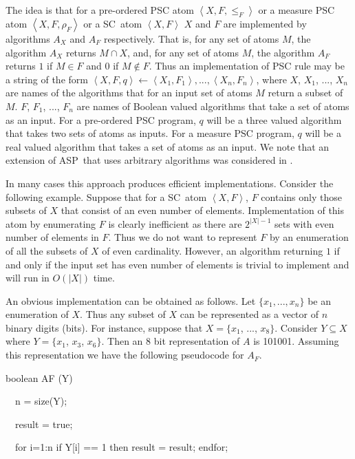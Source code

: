 \documentclass[letterpaper]{article}\usepackage{aaai}
\begin{document}
The idea is that for a pre-ordered PSC atom $\left\langle X,F,\leq
_{F}\right\rangle $ or a measure PSC atom $\left\langle X,F,\rho
_{F}\right\rangle $ or a SC\ atom $\left\langle X,F\right\rangle $ $X$ and $F$
are implemented by algorithms $A_{X}$ and $A_{F}$ respectively. That is, for
any set of atoms $M$, the algorithm $A_{X}$ returns $M\cap X$, and, for any
set of atoms $M$, the algorithm $A_{F}$ returns $1$ if $M\in F$ and $0$ if
$M\notin F$. Thus an implementation of PSC rule may be a string of the form
$\left\langle X,F,q\right\rangle \leftarrow\left\langle X_{1},F_{1}\right\rangle ,...,\left\langle X_{n},F_{n}\right\rangle $, where $X$, $X_{1}$, ..., $X_{n}$ are names of the algorithms that for an input set of atoms $M$
return a subset of $M$. $F$, $F_{1}$, ..., $F_{n}$ are names of Boolean valued
algorithms that take a set of atoms as an input. For a pre-ordered PSC
program, $q$ will be a three valued algorithm that takes two sets of atoms as
inputs. For a measure PSC program, $q$ will be a real valued algorithm that
takes a set of atoms as an input. We note that an extension of ASP\ that uses
arbitrary algorithms was considered in \cite{HybridASP}.

In many cases this approach produces efficient implementations. Consider the
following example. Suppose that for a SC\ atom $\left\langle X,F\right\rangle
$, $F$ contains only those subsets of $X$ that consist of an even number of
elements. Implementation of this atom by enumerating $F$ is clearly
inefficient as there are $2^{\left\vert X\right\vert -1}$ sets with even
number of elements in $F$. Thus we do not want to represent $F$ by an
enumeration of all the subsets of $X$ of even cardinality. However, an
algorithm returning $1$ if and only if the input set has even number of
elements is trivial to implement and will run in $O\left(  |X|\right)  $ time.

An obvious implementation can be obtained as follows. Let $\{x_{1},...,x_{n}\}$ be an enumeration of $X$. Thus any subset of $X$ can be
represented as a vector of $n$ binary digits (bits). For instance, suppose
that $X=\{x_{1}$, ..., $x_{8}\}$. Consider $Y\subseteq X$ where $Y=\{x_{1}$,
$x_{3}$, $x_{6}\}$. Then an 8 bit representation of $A$ is 101001. Assuming
this representation we have the following pseudocode for $A_{F}$.

{\small boolean AF (Y)\ }

{\small \ \ n = size(Y);}

{\small \ \ result = true;}

{\small \ \ for i=1:n if Y[i] == 1 then result = result; endfor;}
\end{document}
